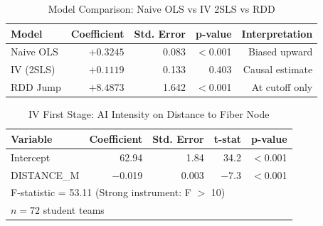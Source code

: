 \documentclass[12pt]{article}
\begin{document}
\begin{table}[H]
    \centering
    \caption{Model Comparison: Naive OLS vs IV 2SLS vs RDD}
    \begin{tabular}{lrrrr}
        \toprule
        \textbf{Model} & \textbf{Coefficient} & \textbf{Std. Error} &
        \textbf{p-value} & \textbf{Interpretation} \\
        \midrule
        Naive OLS  & $+0.3245$ & 0.083 & $<$0.001 & Biased upward \\
        IV (2SLS)  & $+0.1119$ & 0.133 & 0.403    & Causal estimate \\
        RDD Jump   & $+8.4873$ & 1.642 & $<$0.001 & At cutoff only \\
        \bottomrule
    \end{tabular}
    \label{tab:models}
\end{table}

\begin{table}[H]
    \centering
    \caption{IV First Stage: AI Intensity on Distance to Fiber Node}
    \begin{tabular}{lrrrr}
        \toprule
        \textbf{Variable} & \textbf{Coefficient} & \textbf{Std. Error} &
        \textbf{t-stat} & \textbf{p-value} \\
        \midrule
        Intercept      & 62.94  & 1.84  & 34.2 & $<$0.001 \\
        DISTANCE\_M    & $-$0.019 & 0.003 & $-$7.3 & $<$0.001 \\
        \midrule
        \multicolumn{5}{l}{F-statistic = 53.11 \quad (Strong instrument: F $>$ 10)} \\
        \multicolumn{5}{l}{$n = 72$ student teams} \\
        \bottomrule
    \end{tabular}
    \label{tab:firststage}
\end{table}
\end{document}
